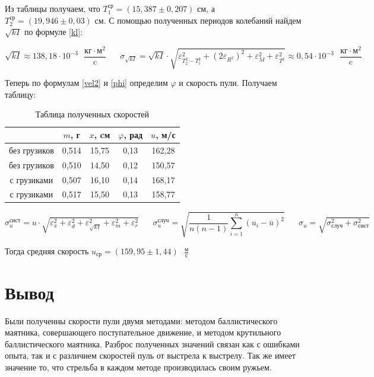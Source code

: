 \documentclass[a4paper,12pt]{article}
\begin{document}
	Из таблицы получаем, что $T_1^{\text{ср}} = (15,387 \pm 0,207) \text{ см}$, а $T_2^{\text{ср}} = (19,946 \pm 0,03)\text{ см}$. С помощью полученных периодов колебаний найдем $\sqrt{kI}$ по формуле \eqref{kl}:
	
	$$\sqrt{kI} \approx 138,18 \cdot 10^{-3} \text{ } \dfrac{\text{кг}\cdot\text{м}^2}{\text{c}} \;\;\;\;\;\; \sigma_{\sqrt{kI}} = \sqrt{kI} \cdot \sqrt{\varepsilon_{T_2^2-T_1^2}^2 + \left(2\varepsilon_{R^2}\right)^2 + \varepsilon_M^2 + \varepsilon_{T^2}^2} \approx 0,54 \cdot 10^{-3} \text{ } \dfrac{\text{кг}\cdot\text{м}^2}{\text{c}}$$
	
	Теперь по формулам \eqref{vel2} и \eqref{phi} определим $\varphi$ и скорость пули. Получаем таблицу:

	\begin{table}[!h]
		\begin{center}
			\begin{tabular}{|c|c|c|c|c|}
				\hline
				& $m$, г& $x$, cм&  $\varphi$, рад& $u$, м/с\\
				\hline
				без грузиков & 0,514 & 15,75 &0,13 & 162,28\\
				\hline
				без грузиков &0,510 &14,50  & 0,12 & 150,57 \\
				\hline
				с грузиками & 0,507 &16,10  &0,14  &168,17  \\
				\hline
				с грузиками & 0,517 &15,50  & 0,13 & 158,77\\
				\hline 
			\end{tabular}
			\caption{Таблица полученных скоростей}
		\end{center}
	\end{table}
	\begin{equation}
		\sigma_u^{\text{сист}} = u\cdot \sqrt{ \varepsilon_x^2+ \varepsilon_d^2+ \varepsilon_{\sqrt{kI}}^2 + \varepsilon_m^2 + \varepsilon_r^2 } \;\;\;\;\;\; \sigma_u^{\text{случ}} =  \sqrt{\frac{1}{n(n-1)} \sum_{i=1}^{n}(u_i - \overline{u})^2} \;\;\;\;\;\;
		\sigma_u = \sqrt{\sigma_{\text{случ}}^2 + \sigma_\text{сист}^2}
	\end{equation}
	
	Тогда средняя скорость \underline{$u_\text{ср} = (159,95 \pm 1,44)\text{ }\frac{\text{м}}{\text{с}} $}
	
	\section{Вывод}
	
	\indent Были полученны скорости пули двумя методами:  методом баллистического маятника, совершающего поступательное движение, и методом крутильного баллистического маятника. Разброс полученных значений связан как с ошибками опыта, так и с различием скоростей пуль от выстрела к выстрелу. Так же имеет значение то, что стрельба в каждом методе производилась своим ружьем.
	
\end{document}
